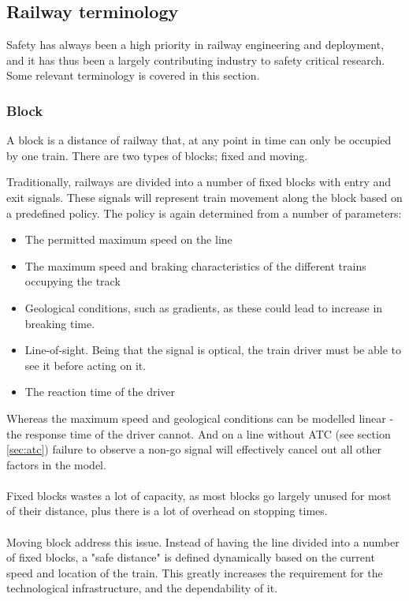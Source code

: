 \documentclass[10pt,oneside]{book}                  %
\begin{document}
\subsection{Railway terminology}
Safety has always been a high priority in railway engineering and deployment, and it has thus been a largely contributing industry to safety critical research. Some relevant terminology is covered in this section.

\subsubsection{Block}
A block is a distance of railway that, at any point in time can only be occupied by one train. There are two types of blocks; fixed and moving.

Traditionally, railways are divided into a number of fixed blocks with entry and exit signals. These signals will represent train movement along the block based on a predefined policy. The policy is again determined from a number of parameters:
\begin{itemize}
  \item The permitted maximum speed on the line
  \item The maximum speed and braking characteristics of the different trains occupying the track
  \item Geological conditions, such as gradients, as these could lead to increase in breaking time.
  \item Line-of-sight. Being that the signal is optical, the train driver must be able to see it before acting on it.
  \item The reaction time of the driver
\end{itemize}
Whereas the maximum speed and geological conditions can be modelled linear - the response time of the driver cannot. And on a line without ATC (see section \ref{sec:atc}) failure to observe a non-go signal will effectively cancel out all other factors in the model.\\
\\
Fixed blocks wastes a lot of capacity, as most blocks go largely unused for most of their distance, plus there is a lot of overhead on stopping times.\\
\\
Moving block address this issue. Instead of having the line divided into a number of fixed blocks, a "safe distance" is defined dynamically based on the current speed and location of the train.
This greatly increases the requirement for the technological infrastructure, and the dependability of it.
\end{document}
